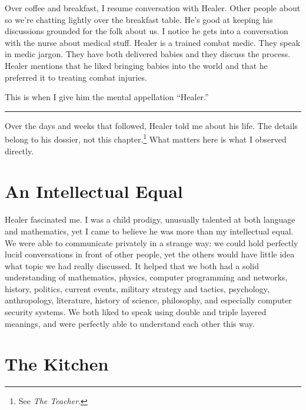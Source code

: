 Over coffee and breakfast, I resume conversation with Healer. Other people about so we're chatting lightly over the breakfast table. He's good at keeping his discussions grounded for the folk about us. I notice he gets into a conversation with the nurse about medical stuff. Healer is a trained combat medic. They speak in medic jargon. They have both delivered babies and they discuss the process. Healer mentions that he liked bringing babies into the world and that he preferred it to treating combat injuries.

This is when I give him the mental appellation ``Healer.''

\vspace{1cm}\noindent\rule{0.5\textwidth}{0.5pt}\vspace{0.5cm}


Over the days and weeks that followed, Healer told me about his life. The details belong to his dossier, not this chapter.\footnote{See \textit{The Teacher}.} What matters here is what I observed directly.

\section*{An Intellectual Equal}
\label{record:af-an-intellectual-equal}

Healer fascinated me. I was a child prodigy, unusually talented at both language and mathematics, yet I came to believe he was more than my intellectual equal. We were able to communicate privately in a strange way: we could hold perfectly lucid conversations in front of other people, yet the others would have little idea what topic we had really discussed. It helped that we both had a solid understanding of mathematics, physics, computer programming and networks, history, politics, current events, military strategy and tactics, psychology, anthropology, literature, history of science, philosophy, and especially computer security systems. We both liked to speak using double and triple layered meanings, and were perfectly able to understand each other this way.

\section*{The Kitchen}
\label{record:af-the-kitchen}

